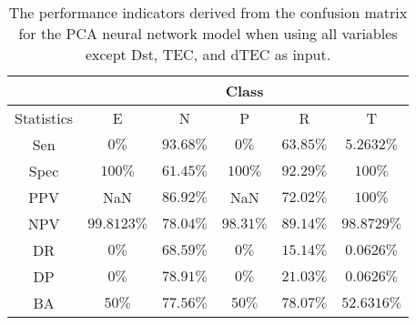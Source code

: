 \begin{table}[!ht]
	\centering
	\begin{tabular}{|c|c|c|c|c|c|}
		\hline
		 & \multicolumn{5}{c|}{Class} \\ \hline
		Statistics & E & N & P & R & T \\ \hline
		Sen & $0\%$ & $93.68\%$ & $0\%$ & $63.85\%$ & $5.2632\%$ \\ \hline
		Spec & $100\%$ & $61.45\%$ & $100\%$ & $92.29\%$ & $100\%$ \\ \hline
		PPV & NaN & $86.92\%$ & NaN & $72.02\%$ & $100\%$ \\ \hline
		NPV & $99.8123\%$ & $78.04\%$ & $98.31\%$ & $89.14\%$ & $98.8729\%$ \\ \hline
		DR & $0\%$ & $68.59\%$ & $0\%$ & $15.14\%$ & $0.0626\%$ \\ \hline
		DP & $0\%$ & $78.91\%$ & $0\%$ & $21.03\%$ & $0.0626\%$ \\ \hline
		BA & $50\%$ & $77.56\%$ & $50\%$ & $78.07\%$ & $52.6316\%$ \\ \hline
	\end{tabular}
	\caption{The performance indicators derived from the confusion matrix for the PCA neural network model when using all variables except Dst, TEC, and dTEC as input.}
	\label{tab:cs:reverse:noTEC:pcaNNet}
\end{table}
